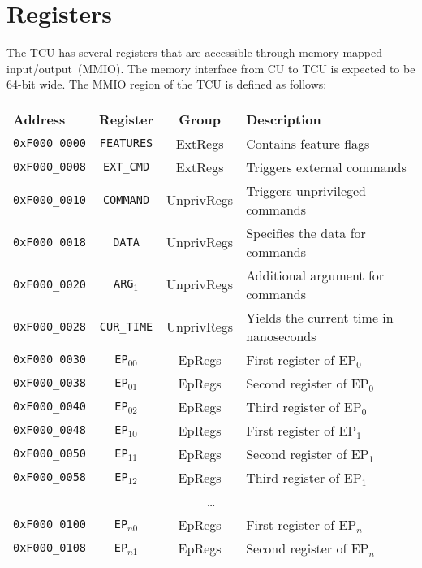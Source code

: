 \section{Registers}

The TCU has several registers that are accessible through memory-mapped input/output~(MMIO). The
memory interface from CU to TCU is expected to be 64-bit wide. The MMIO region of the TCU is defined
as follows:

\vspace{2ex}
\noindent
\begin{tabular}{ p{3cm} | c | c | l }
  \textbf{Address} & \textbf{Register} & \textbf{Group} & \textbf{Description} \\
  \hline
  \hline
  \texttt{0xF000\_0000} & \texttt{FEATURES} & ExtRegs & Contains feature flags \\
  \hline
  \texttt{0xF000\_0008} & \texttt{EXT\_CMD} & ExtRegs & Triggers external commands \\
  \hline
  \hline
  \texttt{0xF000\_0010} & \texttt{COMMAND} & UnprivRegs & Triggers unprivileged commands \\
  \hline
  \texttt{0xF000\_0018} & \texttt{DATA} & UnprivRegs & Specifies the data for commands \\
  \hline
  \texttt{0xF000\_0020} & \texttt{ARG$_1$} & UnprivRegs & Additional argument for commands \\
  \hline
  \texttt{0xF000\_0028} & \texttt{CUR\_TIME} & UnprivRegs & Yields the current time in nanoseconds \\
  \hline
  \hline
  \texttt{0xF000\_0030} & \texttt{EP$_{00}$} & EpRegs & First register of EP$_0$ \\
  \texttt{0xF000\_0038} & \texttt{EP$_{01}$} & EpRegs & Second register of EP$_0$ \\
  \texttt{0xF000\_0040} & \texttt{EP$_{02}$} & EpRegs & Third register of EP$_0$ \\
  \hline
  \texttt{0xF000\_0048} & \texttt{EP$_{10}$} & EpRegs & First register of EP$_1$ \\
  \texttt{0xF000\_0050} & \texttt{EP$_{11}$} & EpRegs & Second register of EP$_1$ \\
  \texttt{0xF000\_0058} & \texttt{EP$_{12}$} & EpRegs & Third register of EP$_1$ \\
  \hline
  \multicolumn{4}{c}{\dots} \\
  \hline
  \texttt{0xF000\_0100} & \texttt{EP$_{n0}$} & EpRegs & First register of EP$_{n}$ \\
  \texttt{0xF000\_0108} & \texttt{EP$_{n1}$} & EpRegs & Second register of EP$_{n}$ \\

\end{tabular}
